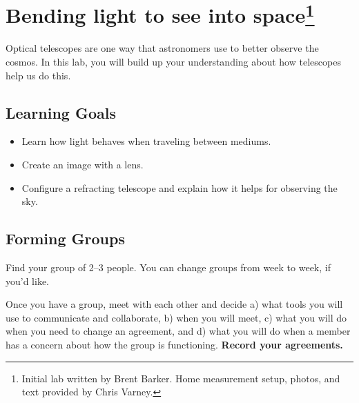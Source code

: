 \chapter[Bending light to see into space]{Bending light to see into space\footnote{Initial lab written by Brent Barker. Home measurement setup, photos, and text provided by Chris Varney.}}


Optical telescopes are one way that astronomers use to better observe the cosmos. In this lab, you will build up your understanding about how telescopes help us do this.

\section{Learning Goals}

\begin{itemize}
	\item Learn how light behaves when traveling between mediums.
	
	\item Create an image with a lens.
	
	\item Configure a refracting telescope and explain how it helps for observing the sky.
\end{itemize}

\section{Forming Groups}

Find your group of 2--3 people. You can change groups from week to week, if you'd like.

\begin{steps}
	\item Once you have a group, meet with each other and decide a) what tools you will use to communicate and collaborate, b) when you will meet, c) what you will do when you need to change an agreement, and d) what you will do when a member has a concern about how the group is functioning. \textbf{Record your agreements.}%
\end{steps}

